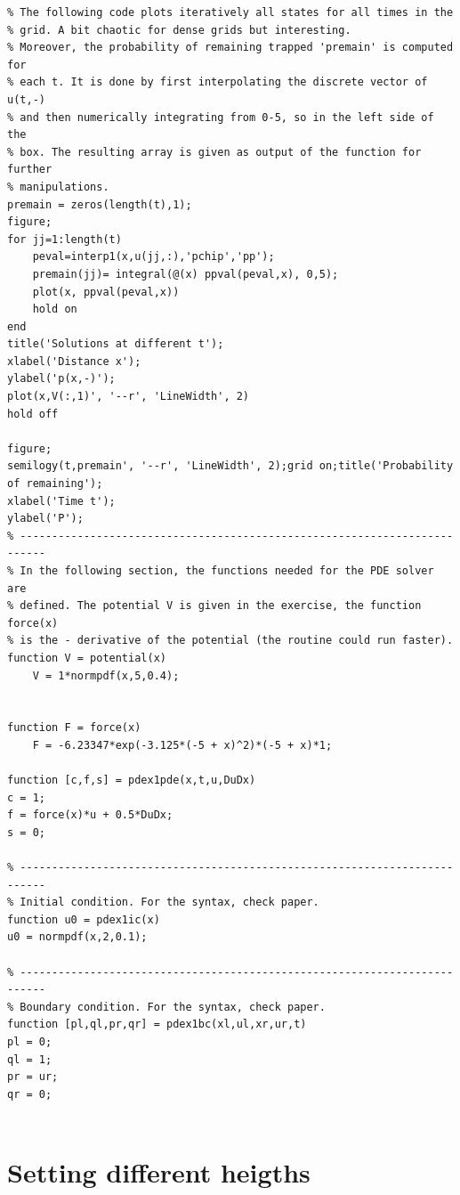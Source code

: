 \documentclass[11pt,letterpaper]{article}
\begin{document}
\begin{lstlisting}
% The following code plots iteratively all states for all times in the
% grid. A bit chaotic for dense grids but interesting.
% Moreover, the probability of remaining trapped 'premain' is computed for
% each t. It is done by first interpolating the discrete vector of u(t,-)
% and then numerically integrating from 0-5, so in the left side of the
% box. The resulting array is given as output of the function for further
% manipulations.
premain = zeros(length(t),1);
figure;
for jj=1:length(t)
    peval=interp1(x,u(jj,:),'pchip','pp');
    premain(jj)= integral(@(x) ppval(peval,x), 0,5);
    plot(x, ppval(peval,x))
    hold on
end
title('Solutions at different t');
xlabel('Distance x');
ylabel('p(x,-)');
plot(x,V(:,1)', '--r', 'LineWidth', 2)
hold off

figure;
semilogy(t,premain', '--r', 'LineWidth', 2);grid on;title('Probability of remaining');
xlabel('Time t');
ylabel('P');
% --------------------------------------------------------------------------
% In the following section, the functions needed for the PDE solver are
% defined. The potential V is given in the exercise, the function force(x)
% is the - derivative of the potential (the routine could run faster).
function V = potential(x)
    V = 1*normpdf(x,5,0.4);


function F = force(x)
    F = -6.23347*exp(-3.125*(-5 + x)^2)*(-5 + x)*1;

function [c,f,s] = pdex1pde(x,t,u,DuDx)
c = 1;
f = force(x)*u + 0.5*DuDx;
s = 0;

% --------------------------------------------------------------------------
% Initial condition. For the syntax, check paper.
function u0 = pdex1ic(x)
u0 = normpdf(x,2,0.1);

% --------------------------------------------------------------------------
% Boundary condition. For the syntax, check paper.
function [pl,ql,pr,qr] = pdex1bc(xl,ul,xr,ur,t)
pl = 0;
ql = 1;
pr = ur;
qr = 0;


\end{lstlisting}

\section{Setting different heigths}
\end{document}
